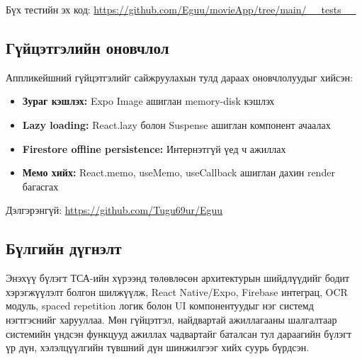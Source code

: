 Бүх тестийн эх код: \url{https://github.com/Eguu/movieApp/tree/main/__tests__}

\subsection{Гүйцэтгэлийн оновчлол}
\label{subsec:performance-optimization}

Аппликейшний гүйцэтгэлийг сайжруулахын тулд дараах оновчлолуудыг хийсэн:

\begin{itemize}
    \item \textbf{Зураг кэшлэх:} Expo Image ашиглан memory-disk кэшлэх
    \item \textbf{Lazy loading:} React.lazy болон Suspense ашиглан компонент ачаалах
    \item \textbf{Firestore offline persistence:} Интернэтгүй үед ч ажиллах
    \item \textbf{Мемо хийх:} React.memo, useMemo, useCallback ашиглан дахин render багасгах
\end{itemize}

Дэлгэрэнгүй: \url{https://github.com/Tugu69ur/Eguu}

\subsection{Бүлгийн дүгнэлт}

Энэхүү бүлэгт ТСА-ийн хүрээнд төлөвлөсөн архитектурын шийдлүүдийг бодит хэрэгжүүлэлт болгон шилжүүлж, React Native/Expo, Firebase интеграц, OCR модуль, spaced repetition логик болон UI компонентуудыг нэг системд нэгтгэснийг харууллаа. Мөн гүйцэтгэл, найдвартай ажиллагааны шалгалтаар системийн үндсэн функцууд ажиллах чадвартайг баталсан тул дараагийн бүлэгт үр дүн, хэлэлцүүлгийн түвшний дүн шинжилгээг хийх суурь бүрдсэн.

\vfill